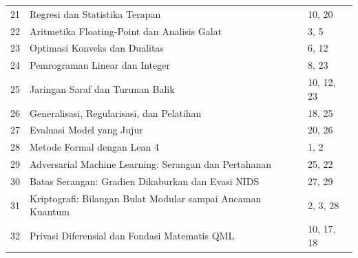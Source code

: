 \begin{center}
\begin{tabular}{@{}r p{9.0cm} p{2.8cm}@{}}
21 & Regresi dan Statistika Terapan & 10, 20 \\
22 & Aritmetika Floating-Point dan Analisis Galat & 3, 5 \\
23 & Optimasi Konveks dan Dualitas & 6, 12 \\
24 & Pemrograman Linear dan Integer & 8, 23 \\
25 & Jaringan Saraf dan Turunan Balik & 10, 12, 23 \\
26 & Generalisasi, Regularisasi, dan Pelatihan & 18, 25 \\
27 & Evaluasi Model yang Jujur & 20, 26 \\
28 & Metode Formal dengan Lean 4 & 1, 2 \\
29 & Adversarial Machine Learning: Serangan dan Pertahanan & 25, 22 \\
30 & Batas Serangan: Gradien Dikaburkan dan Evasi NIDS & 27, 29 \\
31 & Kriptografi: Bilangan Bulat Modular sampai Ancaman Kuantum & 2, 3, 28 \\
32 & Privasi Diferensial dan Fondasi Matematis QML & 10, 17, 18 \\
\bottomrule
\end{tabular}
\end{center}

{}
\tableofcontents
\cleardoublepage
{}
{}
\listoffigures
